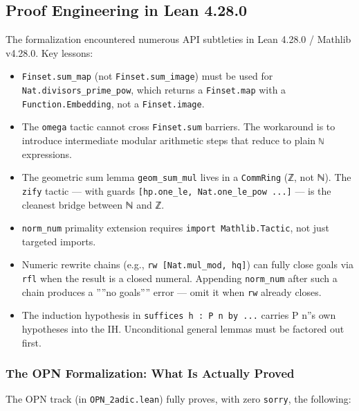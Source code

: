 \documentclass[12pt,a4paper]{article}
\begin{document}
\subsection{Proof Engineering in Lean 4.28.0}

The formalization encountered numerous API subtleties in Lean 4.28.0 / Mathlib v4.28.0. Key lessons:

\begin{itemize}
    \item \texttt{Finset.sum\_map} (not \texttt{Finset.sum\_image}) must be used for \texttt{Nat.divisors\_prime\_pow}, which returns a \texttt{Finset.map} with a \texttt{Function.Embedding}, not a \texttt{Finset.image}.
    \item The \texttt{omega} tactic cannot cross \texttt{Finset.sum} barriers. The workaround is to introduce intermediate modular arithmetic steps that reduce to plain \texttt{ℕ} expressions.
    \item The geometric sum lemma \texttt{geom\_sum\_mul} lives in a \texttt{CommRing} (ℤ, not ℕ). The \texttt{zify} tactic --- with guards \texttt{{[}hp.one\_le, Nat.one\_le\_pow ...{]}} --- is the cleanest bridge between ℕ and ℤ.
    \item \texttt{norm\_num} primality extension requires \texttt{import Mathlib.Tactic}, not just targeted imports.
    \item Numeric rewrite chains (e.g., \texttt{rw {[}Nat.mul\_mod, hq{]}}) can fully close goals via \texttt{rfl} when the result is a closed numeral. Appending \texttt{norm\_num} after such a chain produces a ''''no goals'''' error --- omit it when \texttt{rw} already closes.
    \item The induction hypothesis in \texttt{suffices h : P n by ...} carries P n''s own hypotheses into the IH. Unconditional general lemmas must be factored out first.
\end{itemize}

\subsubsection{The OPN Formalization: What Is Actually Proved}

The OPN track (in \texttt{OPN\_2adic.lean}) fully proves, with zero \texttt{sorry}, the following:
\end{document}
